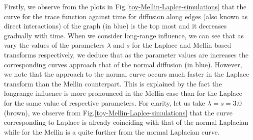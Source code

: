\documentclass[10pt,a4paper]{article}
\theoremstyle{plain}
\theoremstyle{definition}
\begin{document}
    Firstly, we observe from the plots in Fig.\ref{toy-Mellin-Laplce-simulations} that the curve  for the trace function against time for diffusion along edges (also known as direct interactions) of the graph (in blue) is the top most and it decreases gradually with time. When we consider long-range influence, we can see that as vary the values of the parameters $\lambda$ and $s$ for the Laplace and Mellin based transforms respectively, we deduce that as the parameter values are increases the corresponding curves approach that of the normal diffusion (in blue). However, we note that the approach to the normal curve occurs much faster in the Laplace transform than the Mellin counterpart. This is explained by the fact the longrange influence is more pronounced in the Mellin case than for the Laplace for the same value of respective parameters. For clarity, let us take $\lambda=s=3.0$ (brown), we observe from      Fig.\ref{toy-Mellin-Laplce-simulations} that the curve corresponding to Laplace is already coinciding with that of the normal Laplacian while for the Mellin is a quite further from the normal Laplacian curve.
         
\end{document}
